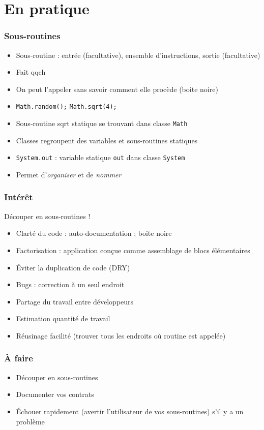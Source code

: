 \documentclass[english, french]{beamer}
\begin{document}
\section{En pratique}
\begin{frame}
	\frametitle{Sous-routines}
	\begin{itemize}
		\item Sous-routine : entrée (facultative), ensemble d’instructions, sortie (facultative)
		\item Fait qqch
		\item On peut l’appeler sans savoir comment elle procède (boite noire)
		\item \texttt{Math.random();} \texttt{Math.sqrt(4);}
		\item Sous-routine sqrt statique se trouvant dans classe \texttt{Math}
		\item Classes regroupent des variables et sous-routines statiques
		\item \texttt{System.out} : variable statique \texttt{out} dans classe \texttt{System}
		\item Permet d’\emph{organiser} et de \emph{nommer}
	\end{itemize}
\end{frame}

\begin{frame}
	\frametitle{Intérêt}
	Découper en sous-routines !
	\begin{itemize}
		\item Clarté du code : auto-documentation ; boite noire
		\item Factorisation : application conçue comme assemblage de blocs élémentaires
		\item Éviter la duplication de code (DRY)
		\item Bugs : correction à un seul endroit
		\item Partage du travail entre développeurs
		\item Estimation quantité de travail
		\item Réusinage facilité (trouver tous les endroits où routine est appelée)
	\end{itemize}
\end{frame}

\begin{frame}
	\frametitle{À faire}
	\begin{itemize}
		\item Découper en sous-routines
		\item Documenter vos contrats
		\item Échouer rapidement (avertir l’utilisateur de vos sous-routines) s’il y a un problème
	\end{itemize}
\end{frame}
\end{document}
